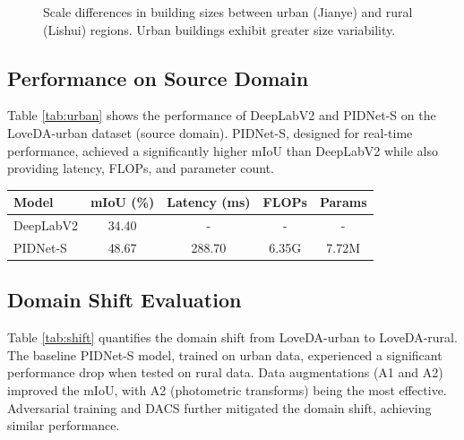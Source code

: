 \documentclass{article}
\begin{document}
\begin{multicols}{2}
\begin{figure}[ht]
\begin{center}
			\caption{Scale differences in building sizes between urban (Jianye) and rural (Lishui) regions. Urban buildings exhibit greater size variability.}  
			\label{fig:scale}  
			\end{center} 
		\end{figure}
		\subsection{Performance on Source Domain}
		Table \ref{tab:urban} shows the performance of DeepLabV2 and PIDNet-S on the LoveDA-urban dataset (source domain). PIDNet-S, designed for real-time performance, achieved a significantly higher mIoU than DeepLabV2 while also providing latency, FLOPs, and parameter count.
		\begin{center} 
			\vspace{2cm}
			
			\label{tab:urban}
			
			\tiny
			\begin{tabular}{|l|c|c|c|c|}
				\hline
				Model & mIoU (\%) & Latency (ms) & FLOPs & Params \\ \hline
				DeepLabV2 & 34.40 & - & - & - \\ \hline
				PIDNet-S & 48.67 & 288.70 & 6.35G & 7.72M \\ \hline
			\end{tabular}
				\vspace{0.2cm}
		\end{center} 
		
		
		
		

		
		\subsection{Domain Shift Evaluation}
		\small
		Table \ref{tab:shift} quantifies the domain shift from LoveDA-urban to LoveDA-rural. The baseline PIDNet-S model, trained on urban data, experienced a significant performance drop when tested on rural data. Data augmentations (A1 and A2) improved the mIoU, with A2 (photometric transforms) being the most effective. Adversarial training and DACS further mitigated the domain shift, achieving similar performance.
		\begin{center}

			\label{tab:shift}
		


\end{center}
\end{multicols}
\end{document}
